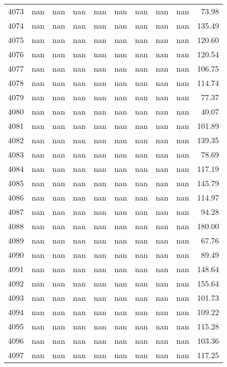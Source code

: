 \begin{tabular}{lrrrrrrrrr}
4073 & nan & nan & nan & nan & nan & nan & nan & nan & 73.98 \\
4074 & nan & nan & nan & nan & nan & nan & nan & nan & 135.49 \\
4075 & nan & nan & nan & nan & nan & nan & nan & nan & 120.60 \\
4076 & nan & nan & nan & nan & nan & nan & nan & nan & 120.54 \\
4077 & nan & nan & nan & nan & nan & nan & nan & nan & 106.75 \\
4078 & nan & nan & nan & nan & nan & nan & nan & nan & 114.74 \\
4079 & nan & nan & nan & nan & nan & nan & nan & nan & 77.37 \\
4080 & nan & nan & nan & nan & nan & nan & nan & nan & 40.07 \\
4081 & nan & nan & nan & nan & nan & nan & nan & nan & 101.89 \\
4082 & nan & nan & nan & nan & nan & nan & nan & nan & 139.35 \\
4083 & nan & nan & nan & nan & nan & nan & nan & nan & 78.69 \\
4084 & nan & nan & nan & nan & nan & nan & nan & nan & 117.19 \\
4085 & nan & nan & nan & nan & nan & nan & nan & nan & 145.79 \\
4086 & nan & nan & nan & nan & nan & nan & nan & nan & 114.97 \\
4087 & nan & nan & nan & nan & nan & nan & nan & nan & 94.28 \\
4088 & nan & nan & nan & nan & nan & nan & nan & nan & 180.00 \\
4089 & nan & nan & nan & nan & nan & nan & nan & nan & 67.76 \\
4090 & nan & nan & nan & nan & nan & nan & nan & nan & 89.49 \\
4091 & nan & nan & nan & nan & nan & nan & nan & nan & 148.64 \\
4092 & nan & nan & nan & nan & nan & nan & nan & nan & 155.64 \\
4093 & nan & nan & nan & nan & nan & nan & nan & nan & 101.73 \\
4094 & nan & nan & nan & nan & nan & nan & nan & nan & 109.22 \\
4095 & nan & nan & nan & nan & nan & nan & nan & nan & 115.28 \\
4096 & nan & nan & nan & nan & nan & nan & nan & nan & 103.36 \\
4097 & nan & nan & nan & nan & nan & nan & nan & nan & 117.25 \\

\end{tabular}
